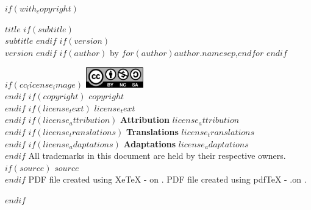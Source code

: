 \documentclass[
    $if(fontsize)$$fontsize$$else$10pt$endif$,
    $if(papersize)$$papersize$$else$letterpaper$endif$,
    titlepage,
    oneside,
    openright,
    $if(is_draft)$draft$else$final$endif$,
    article]{memoir}
\begin{document}
%
%
$if(with_copyright)$
    \thispagestyle{empty}
    \begin{flushleft}
        {\bfseries $title$}
        $if(subtitle)$
            {\\\itshape $subtitle$}
        $endif$
        $if(version)$
            {\normalsize{}\\$version$}
        $endif$
        \hfill\newline
        $if(author)$
            \normalsize by
            $for(author)$\normalsize $author.name$$sep$,\space$endfor$
        $endif$
        \vspace*{1em}

        \vspace*{1.5em}
        $if(cc_license_image)$
            \includegraphics[keepaspectratio=true, width=2.5cm]
                {cc_by_nc_sa_40.eps}\\[1.2em]
        $endif$
        \justify
        $if(copyright)$
            \normalsize $copyright$\\[1.2em]
        $endif$
        $if(license_text)$
            \normalsize $license_text$\\[1.2em]
        $endif$
        $if(license_attribution)$
            \normalsize {\bfseries Attribution}\textemdash%
                 $license_attribution$\\[1.2em]
        $endif$
        $if(license_translations)$
            \normalsize {\bfseries Translations}\textemdash%
                $license_translations$\\[1.2em]
        $endif$
        $if(license_adaptations)$
            \normalsize {\bfseries Adaptations}\textemdash%
                $license_adaptations$\\[1.2em]
        $endif$
        \normalsize All trademarks in this document are held by their %
            respective owners.\\[1.2em]
        $if(source)$
            \normalsize $source$\\[1.2em]
        $endif$
        \ifxetex
            \normalsize PDF file created using XeTeX %
                \the\eTeXversion\eTeXrevision-%
                \the\XeTeXversion\XeTeXrevision\space on \DTMnow.
        \else
            \normalsize PDF file created using pdfTeX %
                \the\eTeXversion\eTeXrevision-%
                \the\pdftexversion.\pdftexrevision\space on \DTMnow.
        \fi
    \end{flushleft}
    \pagebreak
    \cleardoublepage
$endif$
\end{document}
